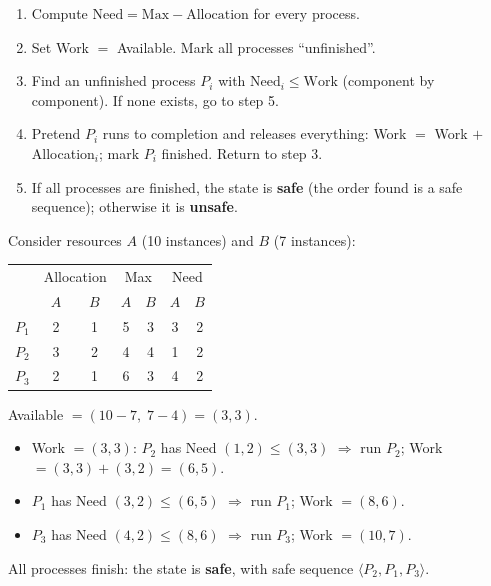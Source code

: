 \documentclass[11pt]{article}
\begin{document}
\begin{methode}
\begin{enumerate}
\item Compute $\text{Need} = \text{Max} - \text{Allocation}$ for every process.
\item Set Work $=$ Available. Mark all processes ``unfinished''.
\item Find an unfinished process $P_i$ with $\text{Need}_i \le \text{Work}$ (component by component). If none exists, go to step 5.
\item Pretend $P_i$ runs to completion and releases everything: Work $=$ Work $+$ Allocation$_i$; mark $P_i$ finished. Return to step 3.
\item If all processes are finished, the state is \textbf{safe} (the order found is a safe sequence); otherwise it is \textbf{unsafe}.
\end{enumerate}
\end{methode}

\begin{exemplebox}
Consider resources $A$ (10 instances) and $B$ (7 instances):

\begin{center}
\begin{tabular}{|l|cc|cc|cc|}
\hline
\rowcolor{popblueL}
 & \multicolumn{2}{c|}{Allocation} & \multicolumn{2}{c|}{Max} & \multicolumn{2}{c|}{Need} \\
\rowcolor{popblueL}
 & $A$ & $B$ & $A$ & $B$ & $A$ & $B$ \\
\hline
$P_1$ & 2 & 1 & 5 & 3 & 3 & 2 \\
$P_2$ & 3 & 2 & 4 & 4 & 1 & 2 \\
$P_3$ & 2 & 1 & 6 & 3 & 4 & 2 \\
\hline
\end{tabular}
\end{center}

Available $= (10-7,\; 7-4) = (3, 3)$.
\begin{itemize}
\item Work $= (3,3)$: $P_2$ has Need $(1,2) \le (3,3)$ $\Rightarrow$ run $P_2$; Work $= (3,3)+(3,2) = (6,5)$.
\item $P_1$ has Need $(3,2) \le (6,5)$ $\Rightarrow$ run $P_1$; Work $= (8,6)$.
\item $P_3$ has Need $(4,2) \le (8,6)$ $\Rightarrow$ run $P_3$; Work $= (10,7)$.
\end{itemize}
All processes finish: the state is \textbf{safe}, with safe sequence $\langle P_2, P_1, P_3 \rangle$.
\end{exemplebox}
\end{document}
